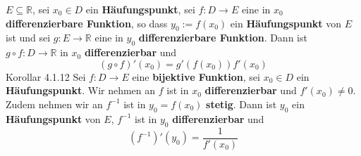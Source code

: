 \documentclass[landscape, 10pt]{article}
\newcommand{\R}{\mathbb{R}}
\begin{document}
\begin{multicols}{3}
                     \textcolor{NavyBlue}{$E\subseteq\R$}, 
                     sei \textcolor{NavyBlue}{$x_0\in D$}
                     ein \textbf{Häufungspunkt}, sei 
                     \textcolor{NavyBlue}{$f:D\longrightarrow E$}
                     eine in \textcolor{NavyBlue}{$x_0$}
                     \textbf{differenzierbare Funktion}, so dass 
                     \textcolor{NavyBlue}{$y_0:=f(x_0)$} ein 
                     \textbf{Häufungspunkt} von 
                     \textcolor{NavyBlue}{$E$} ist und 
                     sei \textcolor{NavyBlue}{
                     $g:E\longrightarrow\R$} eine in 
                     \textcolor{NavyBlue}{$y_0$} 
                     \textbf{differenzierbare Funktion}. 
                     Dann ist 
                     \textcolor{NavyBlue}{
                     $g\circ f:D\longrightarrow\R$} in 
                     \textcolor{NavyBlue}{$x_0$} 
                     \textbf{differenzierbar} und 
                     \begin{equation*}
                            (g\circ f)'(x_0)=g'(f(x_0))f'(x_0)
                     \end{equation*}
              \colorbox{BurntOrange}{Korollar 4.1.12}
                     Sei \textcolor{NavyBlue}{
                     $f:D\longrightarrow E$} eine 
                     \textbf{bijektive Funktion}, sei 
                     \textcolor{NavyBlue}{$x_0\in D$} 
                     ein \textbf{Häufungspunkt}. 
                     Wir nehmen an \textcolor{NavyBlue}{$f$} ist 
                     in \textcolor{NavyBlue}{$x_0$} 
                     \textbf{differenzierbar} und 
                     \textcolor{NavyBlue}{$f'(x_0)\neq0$}. 
                     Zudem nehmen 
                     wir an \textcolor{NavyBlue}{$f^{-1}$} 
                     ist in \textcolor{NavyBlue}{$y_0=f(x_0)$}
                     \textbf{stetig}. Dann ist 
                     \textcolor{NavyBlue}{$y_0$} ein 
                     \textbf{Häufungspunkt} von 
                     \textcolor{NavyBlue}{$E$}, 
                     \textcolor{NavyBlue}{$f^{-1}$} ist in 
                     \textcolor{NavyBlue}{$y_0$} 
                     \textbf{differenzierbar} und 
                     \begin{equation*}
                            (f^{-1})'(y_0)=\frac{1}{f'(x_0)}
                     \end{equation*}

\end{multicols}
\end{document}
